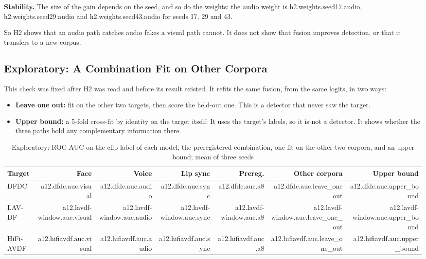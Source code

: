 \textbf{Stability.} The size of the gain depends on the seed, and so do the
weights: the audio weight is {{h2.weights.seed17.audio}},
{{h2.weights.seed29.audio}} and {{h2.weights.seed43.audio}} for seeds 17, 29
and 43.

So H2 shows that an audio path catches audio fakes a visual path cannot. It
does not show that fusion improves detection, or that it transfers to a new
corpus.

\subsection{Exploratory: A Combination Fit on Other Corpora}
\label{sec:a12}

This check was fixed after H2 was read and before its result existed. It
refits the same fusion, from the same logits, in two ways:
\begin{itemize}
    \item \textbf{Leave one out:} fit on the other two targets, then score the
    held-out one. This is a detector that never saw the target.
    \item \textbf{Upper bound:} a 5-fold cross-fit by identity on the target
    itself. It uses the target's labels, so it is not a detector. It shows
    whether the three paths hold any complementary information there.
\end{itemize}

\begin{table}[htbp]
    \centering
    \caption{Exploratory: ROC-AUC on the clip label of each model, the preregistered combination, one fit on the other two corpora, and an upper bound; mean of three seeds}
    \label{tab:a12}
    \begin{tabular}{lrrrrrr}
        \toprule
        Target & Face & Voice & Lip sync & Prereg. & Other corpora & Upper bound \\
        \midrule
        DFDC & {{a12.dfdc.auc.visual}} & {{a12.dfdc.auc.audio}} & {{a12.dfdc.auc.sync}} & {{a12.dfdc.auc.a8}} & {{a12.dfdc.auc.leave_one_out}} & {{a12.dfdc.auc.upper_bound}} \\
        LAV-DF & {{a12.lavdf-window.auc.visual}} & {{a12.lavdf-window.auc.audio}} & {{a12.lavdf-window.auc.sync}} & {{a12.lavdf-window.auc.a8}} & {{a12.lavdf-window.auc.leave_one_out}} & {{a12.lavdf-window.auc.upper_bound}} \\
        HiFi-AVDF & {{a12.hifiavdf.auc.visual}} & {{a12.hifiavdf.auc.audio}} & {{a12.hifiavdf.auc.sync}} & {{a12.hifiavdf.auc.a8}} & {{a12.hifiavdf.auc.leave_one_out}} & {{a12.hifiavdf.auc.upper_bound}} \\
        \bottomrule
    \end{tabular}
\end{table}


